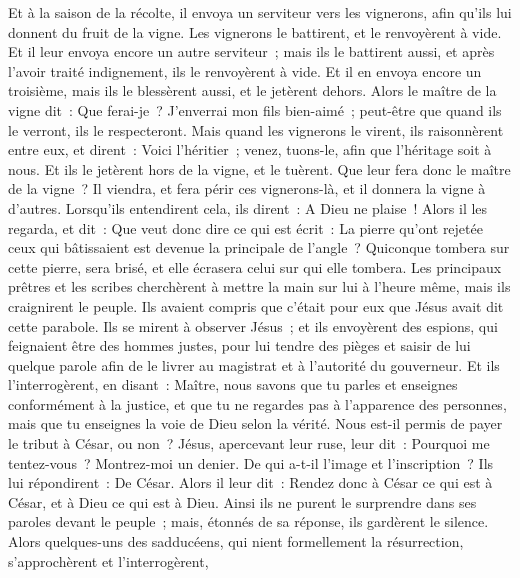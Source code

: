 \begin{multicols}{2}
Et à la saison de la récolte, il envoya un serviteur vers les vignerons, afin qu'ils lui donnent du fruit de la vigne. Les vignerons le battirent, et le renvoyèrent à vide.
Et il leur envoya encore un autre serviteur~; mais ils le battirent aussi, et après l'avoir traité indignement, ils le renvoyèrent à vide.
Et il en envoya encore un troisième, mais ils le blessèrent aussi, et le jetèrent dehors.
Alors le maître de la vigne dit~: Que ferai-je~? J'enverrai mon fils bien-aimé~; peut-être que quand ils le verront, ils le respecteront.
Mais quand les vignerons le virent, ils raisonnèrent entre eux, et dirent~: Voici l'héritier~; venez, tuons-le, afin que l'héritage soit à nous.
Et ils le jetèrent hors de la vigne, et le tuèrent. Que leur fera donc le maître de la vigne~?
Il viendra, et fera périr ces vignerons-là, et il donnera la vigne à d'autres. Lorsqu'ils entendirent cela, ils dirent~: A Dieu ne plaise~!
Alors il les regarda, et dit~: Que veut donc dire ce qui est écrit~: La pierre qu'ont rejetée ceux qui bâtissaient est devenue la principale de l'angle~?
Quiconque tombera sur cette pierre, sera brisé, et elle écrasera celui sur qui elle tombera.
Les principaux prêtres et les scribes cherchèrent à mettre la main sur lui à l'heure même, mais ils craignirent le peuple. Ils avaient compris que c'était pour eux que Jésus avait dit cette parabole.
Ils se mirent à observer Jésus~; et ils envoyèrent des espions, qui feignaient être des hommes justes, pour lui tendre des pièges et saisir de lui quelque parole afin de le livrer au magistrat et à l'autorité du gouverneur.
Et ils l'interrogèrent, en disant~: Maître, nous savons que tu parles et enseignes conformément à la justice, et que tu ne regardes pas à l'apparence des personnes, mais que tu enseignes la voie de Dieu selon la vérité.
Nous est-il permis de payer le tribut à César, ou non~?
Jésus, apercevant leur ruse, leur dit~: Pourquoi me tentez-vous~?
Montrez-moi un denier. De qui a-t-il l'image et l'inscription~? Ils lui répondirent~: De César.
Alors il leur dit~: Rendez donc à César ce qui est à César, et à Dieu ce qui est à Dieu.
Ainsi ils ne purent le surprendre dans ses paroles devant le peuple~; mais, étonnés de sa réponse, ils gardèrent le silence.
Alors quelques-uns des sadducéens, qui nient formellement la résurrection, s'approchèrent et l'interrogèrent,

\end{multicols}
